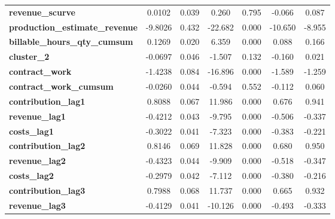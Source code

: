 \begin{center}
\begin{tabular}{lcccccc}
\textbf{revenue\_scurve}                    &       0.0102  &        0.039     &     0.260  &         0.795        &       -0.066    &        0.087     \\
\textbf{production\_estimate\_revenue}      &      -9.8026  &        0.432     &   -22.682  &         0.000        &      -10.650    &       -8.955     \\
\textbf{billable\_hours\_qty\_cumsum}       &       0.1269  &        0.020     &     6.359  &         0.000        &        0.088    &        0.166     \\
\textbf{cluster\_2}                         &      -0.0697  &        0.046     &    -1.507  &         0.132        &       -0.160    &        0.021     \\
\textbf{contract\_work}                     &      -1.4238  &        0.084     &   -16.896  &         0.000        &       -1.589    &       -1.259     \\
\textbf{contract\_work\_cumsum}             &      -0.0260  &        0.044     &    -0.594  &         0.552        &       -0.112    &        0.060     \\
\textbf{contribution\_lag1}                 &       0.8088  &        0.067     &    11.986  &         0.000        &        0.676    &        0.941     \\
\textbf{revenue\_lag1}                      &      -0.4212  &        0.043     &    -9.795  &         0.000        &       -0.506    &       -0.337     \\
\textbf{costs\_lag1}                        &      -0.3022  &        0.041     &    -7.323  &         0.000        &       -0.383    &       -0.221     \\
\textbf{contribution\_lag2}                 &       0.8146  &        0.069     &    11.828  &         0.000        &        0.680    &        0.950     \\
\textbf{revenue\_lag2}                      &      -0.4323  &        0.044     &    -9.909  &         0.000        &       -0.518    &       -0.347     \\
\textbf{costs\_lag2}                        &      -0.2979  &        0.042     &    -7.112  &         0.000        &       -0.380    &       -0.216     \\
\textbf{contribution\_lag3}                 &       0.7988  &        0.068     &    11.737  &         0.000        &        0.665    &        0.932     \\
\textbf{revenue\_lag3}                      &      -0.4129  &        0.041     &   -10.126  &         0.000        &       -0.493    &       -0.333     \\

\end{tabular}
\end{center}
